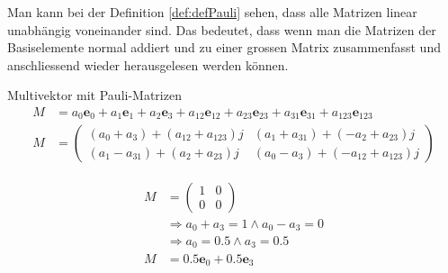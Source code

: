 Man kann bei der Definition \ref{def:defPauli} sehen, dass alle Matrizen linear unabhängig voneinander sind. Das bedeutet, dass wenn man die Matrizen der Basiselemente normal addiert und zu einer grossen Matrix zusammenfasst und anschliessend wieder herausgelesen werden können.
\begin{definition}
	Multivektor mit Pauli-Matrizen
	\begin{align}
		M &= a_0\mathbf{e}_0 + a_1\mathbf{e}_1 + a_2\mathbf{e}_3 + a_{12}\mathbf{e}_{12} + a_{23}\mathbf{e}_{23} + a_{31}\mathbf{e}_{31} + a_{123}\mathbf{e}_{123}\\
		M &=
		\begin{pmatrix}
			(a_0+a_3) + (a_{12}+a_{123})j & (a_1+a_{31})+(-a_2+a_{23})j \\
			(a_1-a_{31})+(a_2+a_{23})j & (a_0-a_3)+(-a_{12}+a_{123})j
		\end{pmatrix}  
	\end{align}
\end{definition}
\begin{beispiel}
	\begin{align}
		M &= \begin{pmatrix}
			1 & 0 \\
			0 & 0
		\end{pmatrix}\\
		&\Rightarrow a_0 + a_3 = 1 \land a_0 - a_3 = 0\\
		&\Rightarrow a_0 = 0.5 \land a_3 = 0.5\\
		M &= 0.5 \mathbf{e}_0 + 0.5 \mathbf{e}_3
	\end{align}
\end{beispiel}